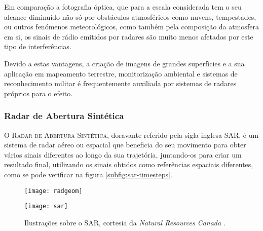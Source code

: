 \documentclass[purist,portuguese]{ist-report}
\begin{document}
Em comparação a fotografia óptica, que para a escala considerada tem o seu alcance diminuído não só por obstáculos atmosféricos como nuvens, tempestades, ou outros fenómenos meteorológicos, como também pela composição da atmosfera em si, os sinais de rádio emitidos por radares são muito menos afetados por este tipo de interferências.

Devido a estas vantagens, a criação de imagens de grandes superfícies e a sua aplicação em mapeamento terrestre, monitorização ambiental e sistemas de reconhecimento militar é frequentemente auxiliada por sistemas de radares próprios para o efeito.

\subsubsection{Radar de Abertura Sintética}

O \textsc{Radar de Abertura Sintética}, doravante referido pela sigla inglesa SAR, é um sistema de radar aéreo ou espacial que beneficia do seu movimento para obter vários sinais diferentes ao longo da sua trajetória, juntando-os para criar um resultado final, utilizando os sinais obtidos como referências espaciais diferentes, como se pode verificar na figura \ref{subfig:sar-timesteps}.

\begin{figure}[ht]
	\centering
	\hspace*{\fill}
	\begin{minipage}[t]{0.43\textwidth}
		\centering
		\texttt{[image: radgeom]}
		\label{subfig:sar-side}
	\end{minipage}
	\hfill
	\begin{minipage}[t]{0.43\textwidth}
		\centering
		\texttt{[image: sar]}
		\label{subfig:sar-timesteps}
	\end{minipage}
	\hspace*{\fill}
	\caption{Ilustrações sobre o SAR, cortesia da \textit{Natural Resources Canada} \cite{nrcan}.}
	\label{fig:nrcan}
\end{figure}
\end{document}
